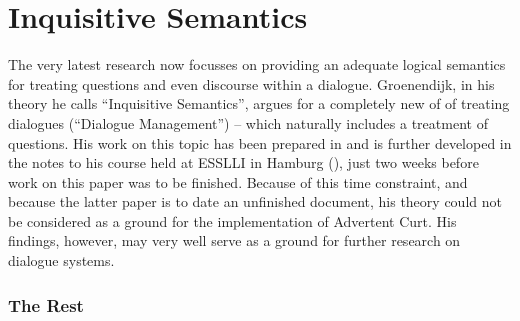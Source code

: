 \documentclass[notitlepage,twoside,a4paper]{scrreprt}
\newcommand{\pn}{\textsf} %
\newcommand{\acurt}{\pn{Advertent Curt}}
\theoremstyle{remark}
\theoremstyle{remark}
\theoremstyle{definition}
\theoremstyle{definition}
\begin{document}





\section{Inquisitive Semantics}\label{sec:altq}

The very latest research now focusses on providing an adequate logical semantics
for treating questions and even discourse within a dialogue. Groenendijk, in his
theory he calls ``Inquisitive Semantics'', argues for a completely new of of
treating dialogues (``Dialogue Management'') -- which naturally includes a
treatment of questions. His work on this topic has been prepared in \cite{g:is}
and is further developed in the notes to his course held at ESSLLI in Hamburg
(\cite{g:isdm}), just two weeks before work on this paper was to be finished.
Because of this time constraint, and because the latter paper is to date an
unfinished document, his theory could not be considered as a ground for the
implementation of \acurt. His findings, however, may very well serve as a ground
for further research on dialogue systems.

\subsubsection{The Rest}
\end{document}
